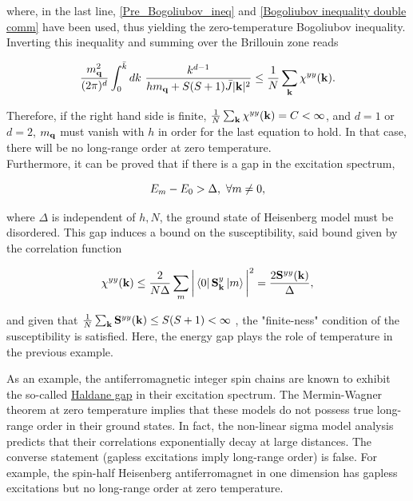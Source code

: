 \documentclass{homework}
\begin{document}
where, in the last line, 
\cref{Pre_Bogoliubov_ineq} and \cref{Bogoliubov inequality double comm} have been used, thus yielding the zero-temperature Bogoliubov inequality. Inverting this inequality and summing over the Brillouin zone reads

\begin{equation}
    \frac{m_{\bf q}^2}{(2\pi)^d} \int_{0}^{\bar{k}} dk \textnormal{ } \frac{k^{d-1}}{h m_{\bf q} + S(S+1) \bar{J} |{\bf k}|^2} \leq \frac{1}{N} \sum_{{\bf k}} \chi^{yy}({\bf k}).
\end{equation}

Therefore, if the right hand side is finite, $\frac{1}{N} \sum_{{\bf k}} \chi^{yy}({\bf k}) = C < \infty$, and $d=1$ or $d=2$, $m_{{\bf q}}$ must vanish with $h$ in order for the last equation to hold. In that case, there will be no long-range order at zero temperature. \\

Furthermore, it can be proved that if there is a gap in the excitation spectrum, 

$$
    E_m - E_0 > \Delta, \textnormal{ } \forall m \neq 0,
$$

where $\Delta$ is independent of $h, N$, the ground state of Heisenberg model must be disordered. This gap induces a bound on the susceptibility, said bound given by the correlation function

\begin{equation}
    \chi^{yy}({\bf k}) \leq \frac{2}{N \Delta} \sum_{m} \bigg|\bra{0}\spin_{{\bf k}}^y \ket{m}\bigg|^2 = \frac{2 \spin^{yy}({\bf k})}{\Delta},
\end{equation}

and given that $\frac{1}{N} \sum_{{\bf k}} {\bf S}^{yy}({\bf k}) \leq S(S+1) < \infty$ , the "finite-ness" condition of the susceptibility is satisfied. Here, the energy gap plays the role of temperature in the previous example. \\

\begin{tcolorbox}[colback=my-blue, 
title = Physical Context]

As an example, the antiferromagnetic integer spin chains are known to exhibit the so-called \underline{Haldane gap} in their excitation spectrum. The Mermin-Wagner theorem at zero temperature implies that these models do not possess true long-range order in their ground states. In fact, the non-linear sigma model analysis predicts that their correlations exponentially decay at large distances. The converse statement (gapless excitations imply long-range order) is false. For example, the spin-half Heisenberg antiferromagnet in one dimension has gapless excitations but no long-range order at zero temperature. 

\end{tcolorbox}
\end{document}
